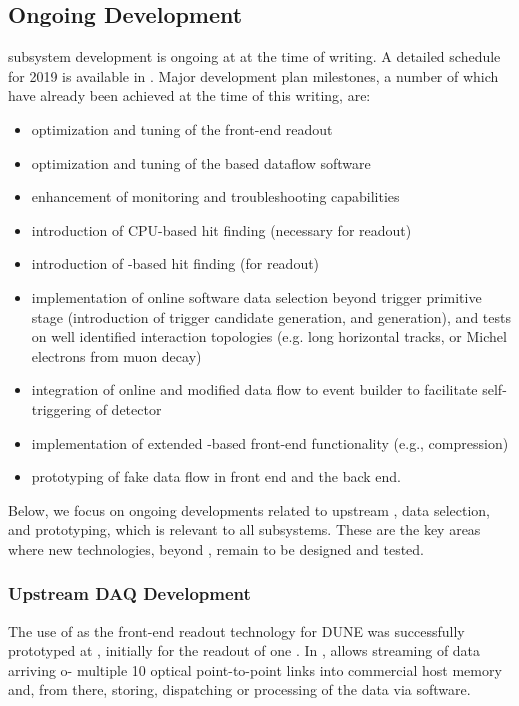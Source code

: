 \subsection{Ongoing Development}
\label{sec:sp-daq:design-validation}

 subsystem development is ongoing at  at the time of
writing. A detailed schedule for 2019 is available
in \cite{bib:docdb14095}. Major development plan milestones, a number
of which have already been achieved at the time of this writing, are:
\begin{itemize}
\item optimization and tuning of the front-end readout
\item optimization and tuning of the  based dataflow software
\item enhancement of monitoring and troubleshooting capabilities
\item introduction of CPU-based hit finding (necessary for  readout)
\item introduction of -based hit finding (for  readout)
\item implementation of online software data selection beyond trigger
primitive stage (introduction of trigger candidate generation, and
 generation), and tests on well identified interaction
topologies (e.g. long horizontal tracks, or Michel electrons from muon decay)
\item integration of online  and modified data flow to event
builder to facilitate self-triggering of detector
\item implementation of extended -based front-end functionality
(e.g., compression)
\item prototyping of fake  data flow in front end and the back end.
\end{itemize}

Below, we focus on ongoing developments related to upstream ,
data selection, and  prototyping, which is relevant to all  subsystems. These are the key areas where new technologies, beyond , remain to be designed and tested.


\subsubsection{Upstream DAQ Development}

The use of  as the front-end readout technology for DUNE was
successfully prototyped at , initially for the readout of one
. In ,  allows streaming of data arriving o- multiple \SI{10}{\Gbps} optical point-to-point links into commercial host memory and,
from there, storing, dispatching or processing of the data via
software. 

